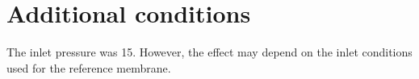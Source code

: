 \section{Additional conditions}
The inlet pressure was \num{15}.
However, the effect may depend on the inlet conditions used for the reference membrane.

